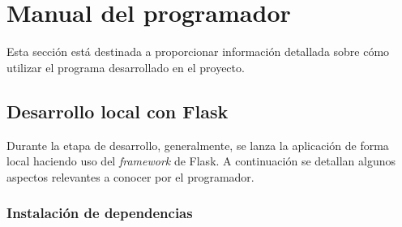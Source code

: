 
\section{Manual del programador}

Esta sección está destinada a proporcionar información detallada sobre cómo utilizar el programa desarrollado en el proyecto.

\subsection{Desarrollo local con Flask}
Durante la etapa de desarrollo, generalmente, se lanza la aplicación de forma local haciendo uso del \textit{framework} de Flask. A continuación se detallan algunos aspectos relevantes a conocer por el programador.

\subsubsection{\textbf{Instalación de dependencias}}

